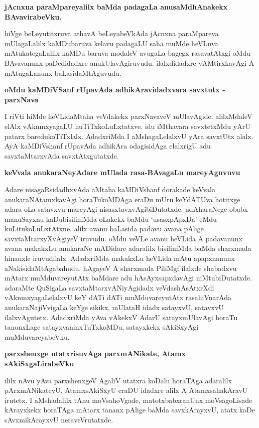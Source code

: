 \noindent
{\bf\large{jAcnxna paraMpareyalilx baMda padagaLa anusaMdhAnakekx BAvavirabeVku.}}\label{page140}

hiVge beLeyutitxruva athavA beLeyabeVkAda jAcnxna paraMpareya mUlagaLalilx kaMDubaruva kelavu padagaLU saha muMde heVLuva mAtukategaLalilx kaMDu baruva modaleV avugaLa bagegx rasavatAtxgi oMdu BAvavanunx paDedidadxre anukUlavAgiruvudu. ilalxdidadxre yAMtirxkavAgi A mAtugaLanunx baLasidaMtAguvudu.

\noindent
{\bf\large{oMdu kaMDiVSanf rUpavAda adhikAravidadxvara savxtutx - parxNava}}\label{page140}

I riVti hiMde heVLidaMtaha veVdakekx parxNavaveV mUlavAgide. alilxMdaleV elAlx vAknmxyagaLU huTiTxkoLuLxtatxve. idu iMthavara savxtetxMdu yArU patarx baredukoTiTxlalx. AdadxriMda I aMshagaLelalxvU yAra savxtUtx alalx. AyA kaMDiVshanf rUpavAda adhikAra odagisidAga elalxrigU adu savxtaMtarxvAda savxtAtxgutatxde.

\noindent
{\bf\large{keVvala anukaraNeyAdare mUlada rasa-BAvagaLu mareyAguvuvu}}\label{page141}

Adare nisagaRsidadhxvAda aMtaha kaMDiVshanf dorakade keVvala anukaraNAtamxkavAgi horaTukoMDAga eraDu mUru keYdATUva hotitxge adara oLa satavxvu mareyAgi nisasxtavxvAgibiDutatxde. udAharaNege obabx manuSayxnu kaDubisiliniMda oLakekx baMdu `usasxpApxDa' eMdu kuLitukoLuLxtAtxne. alilx avanu baLasida padavu avana pAlige savxtaMtarxyXvAgiyeV iruvudu. oMdu veVLe avanu heVLida A padavanunx avana makakxLu anukaraNe mADidare adaralilx bisiliniMda baMda sharxmada hinanxle iruvudilalx. AdadxriMda makakxLu heVLida mAtu apapxnanunx aNakisidaMtAgabahudu. hAgayeV A sharxmada PiliMgf ilalxde shabadxvu mAtarx muMduvareyutAtx baMdare adu hAsAyxsapxdavAgi niMtubiDutatxde. adaraMte QuSigaLa savxtaMtarxvANiyAgidadx veVdashAsAtxrXdi vAknmxyagaLelalxvU keY dATi dATi muMduvareyutAtx rasahiVnarAda anukaraNajiVvigaLa keYge sikikx, mUlataH idadx satayxvU, satavxvU ilalxvAgutetx. AdadxriMda yAva vAkekxV AdarU satayxmUlavAgi horaTu tanonxLage satayxvaninxTuTxkoMDu, satayxkekx sAkiSxyAgi muMduvareyabeVku.

\noindent
{\bf\large{parxshenxge utatxrisuvAga parxmANikate, Atamx sAkiSxgaLirabeVku}}\label{page141}

ililx nAvu yAva parxshenxgeV AgaliV utatxra koDalu horaTAga adaralilx pArxmANikateyU, AtamxsAkiSxyU eraDU idadxre alilx A AtamxsahakAravU irutetx. I aMshadalilx tAnu moVsahoVgade, matotxbabxranUnx moVsagoLisade kArayxkekx horaTAga mAtarx tananx pAlige baMda savxkArayxvU, atatx kaDe sAvxmikArayxvU neraveVrutatxde.

